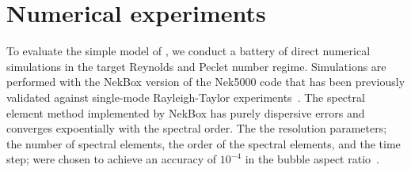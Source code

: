\section{Numerical experiments}

To evaluate the simple model of , we conduct a battery of direct numerical simulations in the target Reynolds and Peclet number regime.
Simulations are performed with the NekBox version of the Nek5000 code that has been previously validated against single-mode Rayleigh-Taylor experiments~\cite{Validation2016,Wilkinson2007}.
The spectral element method implemented by NekBox has purely dispersive errors and converges expoentially with the spectral order.
The the resolution parameters; the number of spectral elements, the order of the spectral elements, and the time step; were chosen to achieve an accuracy of $10^{-4}$ in the bubble aspect ratio~\cite{Convergence2016}.



